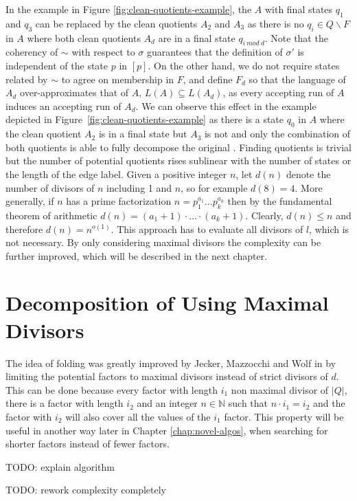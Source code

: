 In the example in Figure \ref{fig:clean-quotients-example}, the \DFA $A$ with final states $q_1$ and $q_3$ can be replaced by the clean quotients $A_2$ and $A_3$ as there is no $q_i \in Q \backslash F$ in $A$ where both clean quotients $A_d$ are in a final state $q_{i ~mod~ d}$. Note that the coherency of $\sim$ with respect to $\sigma$ guarantees that the definition of $\sigma'$ is independent of the state $p$ in $[p]$. On the other hand, we do not require states related by $\sim$ to agree on membership in $F$, and define $F_d$ so that the language of $A_d$ over-approximates that of $A$, $L(A) \subseteq L(A_d)$, as every accepting run of $A$ induces an accepting run of $A_d$. We can observe this effect in the example depicted in Figure~\ref{fig:clean-quotients-example} as there is a state $q_0$ in $A$ where the clean quotient $A_2$ is in a final state but $A_3$ is not and only the combination of both quotients is able to fully decompose the original \DFA. Finding quotients is trivial but the number of potential quotients rises sublinear with the number of states or the length of the edge label. Given a positive integer $n$, let $d(n)$ denote the number of divisors of $n$ including 1 and $n$, so for example $d(8)=4$. More generally, if $n$ has a prime factorization $n = p_1^{a_1} \ldots p_k^{a_k}$ then by the fundamental theorem of arithmetic $d(n) = (a_1+1) \cdot \ldots \cdot (a_k+1)$. Clearly, $d(n) \leq n$ and therefore $d(n) = n^{o(1)}$. This approach has to evaluate all divisors of $l$, which is not necessary. By only considering maximal divisors the complexity can be further improved, which will be described in the next chapter.

\section{Decomposition of \DFAs Using Maximal Divisors}
\label{ch:analysis:max-divisors}
The idea of folding \DFAs was greatly improved by Jecker, Mazzocchi and Wolf in \cite{DBLP:journals/corr/abs-2107-04683} by limiting the potential factors to maximal divisors instead of strict divisors of $d$. This can be done because every factor with length $i_1$ non maximal divisor of $|Q|$, there is a factor with length $i_2$ and an integer $n \in \mathbb{N}$ such that $n \cdot i_1 = i_2$ and the factor with $i_2$ will also cover all the values of the $i_1$ factor. This property will be useful in another way later in Chapter \ref{chap:novel-algos}, when searching for shorter factors instead of fewer factors.

TODO: explain algorithm

TODO: rework complexity completely 




